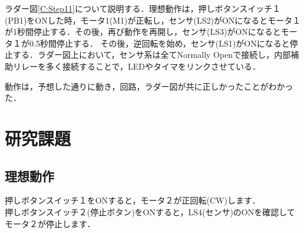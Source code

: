\documentclass[a4paper,11pt]{jsarticle}
\begin{document}
ラダー図\ref{C:Step11}について説明する．理想動作は，押しボタンスイッチ１(PB1)をONした時，モータ1(M1)が正転し，センサ(LS2)がONになるとモータ１が1秒間停止する．その後，再び動作を再開し，センサ(LS3)がONになるとモータ１が0.5秒間停止する．
その後，逆回転を始め，センサ(LS1)がONになると停止する．ラダー図上において，センサ系は全てNormally Openで接続し，内部補助リレーを多く接続することで，LEDやタイマをリンクさせている．\par
動作は，予想した通りに動き，回路，ラダー図が共に正しかったことがわかった．

\section{研究課題}
\subsection{理想動作}
押しボタンスイッチ１をONすると，モータ２が正回転(CW)します．\\
押しボタンスイッチ２(停止ボタン)をONすると，LS4(センサ)のONを確認してモータ２が停止します．
\end{document}

